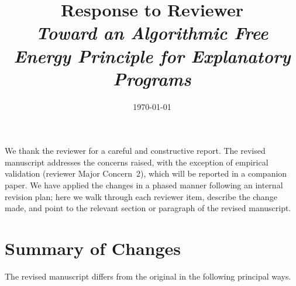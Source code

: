 \documentclass[11pt]{article}
\title{Response to Reviewer\\
\large \emph{Toward an Algorithmic Free Energy Principle for Explanatory Programs}}
\author{}
\date{\today}
\begin{document}
\maketitle

We thank the reviewer for a careful and constructive report. The revised manuscript addresses the concerns raised, with the exception of empirical validation (reviewer Major Concern~2), which will be reported in a companion paper. We have applied the changes in a phased manner following an internal revision plan; here we walk through each reviewer item, describe the change made, and point to the relevant section or paragraph of the revised manuscript.

\section*{Summary of Changes}

The revised manuscript differs from the original in the following principal ways.
\end{document}

